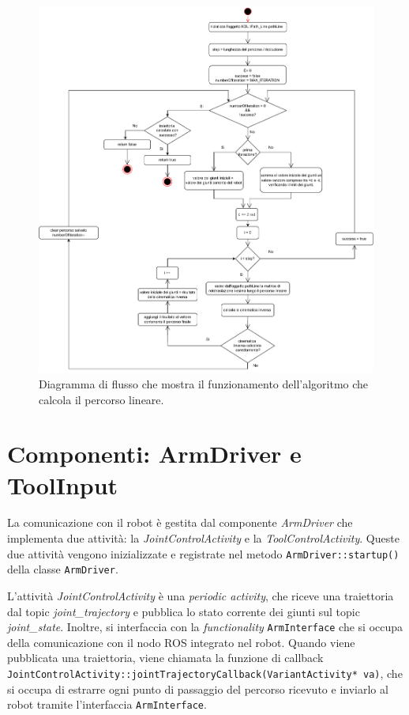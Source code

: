 \begin{figure}[ht!]
	\centering
	\includegraphics[width=1\linewidth]{./ImageFiles/ComputeLinearTrajectory.drawio.pdf}	\caption{Diagramma di flusso che mostra il funzionamento dell'algoritmo che calcola il percorso lineare.}
	\label{fig:algorithm}
\end{figure}
\clearpage

\section{Componenti: ArmDriver e ToolInput}
La comunicazione con il robot è gestita dal componente \textit{ArmDriver} che implementa due attività: la \textit{JointControlActivity} e la \textit{ToolControlActivity}. Queste due attività vengono inizializzate e registrate nel metodo \texttt{ArmDriver::startup()} della classe \texttt{ArmDriver}. 

L'attività \textit{JointControlActivity} è una \textit{periodic activity}, che riceve una traiettoria dal topic \textit{joint\_trajectory} e pubblica lo stato corrente dei giunti sul topic \textit{joint\_state}. Inoltre, si interfaccia con la \textit{functionality} \texttt{ArmInterface} che si occupa della comunicazione con il nodo ROS integrato nel robot. Quando viene pubblicata una traiettoria, viene chiamata la funzione di callback \texttt{JointControlActivity::jointTrajectoryCallback(VariantActivity* va)}, che si occupa di estrarre ogni punto di passaggio del percorso ricevuto e inviarlo al robot tramite l'interfaccia \texttt{ArmInterface}. 

